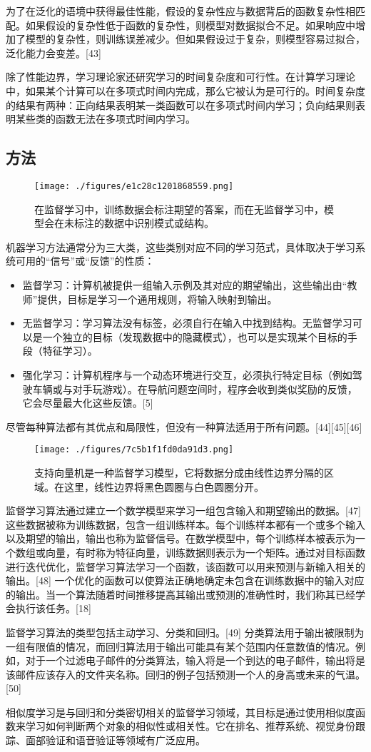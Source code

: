 为了在泛化的语境中获得最佳性能，假设的复杂性应与数据背后的函数复杂性相匹配。如果假设的复杂性低于函数的复杂性，则模型对数据拟合不足。如果响应中增加了模型的复杂性，则训练误差减少。但如果假设过于复杂，则模型容易过拟合，泛化能力会变差。[43]

除了性能边界，学习理论家还研究学习的时间复杂度和可行性。在计算学习理论中，如果某个计算可以在多项式时间内完成，那么它被认为是可行的。时间复杂度的结果有两种：正向结果表明某一类函数可以在多项式时间内学习；负向结果则表明某些类的函数无法在多项式时间内学习。
\subsection{方法}
\begin{figure}[ht]
\centering
\texttt{[image: ./figures/e1c28c1201868559.png]}
\caption{在监督学习中，训练数据会标注期望的答案，而在无监督学习中，模型会在未标注的数据中识别模式或结构。} \label{fig_JQXX_2}
\end{figure}
机器学习方法通常分为三大类，这些类别对应不同的学习范式，具体取决于学习系统可用的“信号”或“反馈”的性质：
\begin{itemize}
\item 监督学习：计算机被提供一组输入示例及其对应的期望输出，这些输出由“教师”提供，目标是学习一个通用规则，将输入映射到输出。
\item 无监督学习：学习算法没有标签，必须自行在输入中找到结构。无监督学习可以是一个独立的目标（发现数据中的隐藏模式），也可以是实现某个目标的手段（特征学习）。
\item 强化学习：计算机程序与一个动态环境进行交互，必须执行特定目标（例如驾驶车辆或与对手玩游戏）。在导航问题空间时，程序会收到类似奖励的反馈，它会尽量最大化这些反馈。[5]
\end{itemize}
尽管每种算法都有其优点和局限性，但没有一种算法适用于所有问题。[44][45][46]

\begin{figure}[ht]
\centering
\texttt{[image: ./figures/7c5b1f1fd0da91d3.png]}
\caption{支持向量机是一种监督学习模型，它将数据分成由线性边界分隔的区域。在这里，线性边界将黑色圆圈与白色圆圈分开。} \label{fig_JQXX_3}
\end{figure}
监督学习算法通过建立一个数学模型来学习一组包含输入和期望输出的数据。[47] 这些数据被称为训练数据，包含一组训练样本。每个训练样本都有一个或多个输入以及期望的输出，输出也称为监督信号。在数学模型中，每个训练样本被表示为一个数组或向量，有时称为特征向量，训练数据则表示为一个矩阵。通过对目标函数进行迭代优化，监督学习算法学习一个函数，该函数可以用来预测与新输入相关的输出。[48] 一个优化的函数可以使算法正确地确定未包含在训练数据中的输入对应的输出。当一个算法随着时间推移提高其输出或预测的准确性时，我们称其已经学会执行该任务。[18]

监督学习算法的类型包括主动学习、分类和回归。[49] 分类算法用于输出被限制为一组有限值的情况，而回归算法用于输出可能具有某个范围内任意数值的情况。例如，对于一个过滤电子邮件的分类算法，输入将是一个到达的电子邮件，输出将是该邮件应该存入的文件夹名称。回归的例子包括预测一个人的身高或未来的气温。[50]

相似度学习是与回归和分类密切相关的监督学习领域，其目标是通过使用相似度函数来学习如何判断两个对象的相似性或相关性。它在排名、推荐系统、视觉身份跟踪、面部验证和语音验证等领域有广泛应用。
